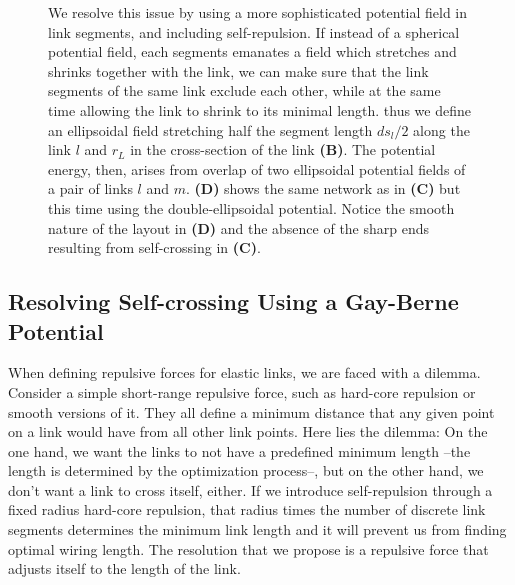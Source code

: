 \documentclass[nofootinbib,preprint,floatfix,titlepage,superscriptaddress]{revtex4} %
\begin{document}
\begin{figure}
{    We resolve this issue by using a more sophisticated potential field in link segments, and including self-repulsion. 
    If instead of a spherical potential field, each segments emanates a field which stretches and shrinks together with the link, we can make sure that the link segments of the same link exclude each other, while at the same time allowing the link to shrink to its minimal length.
    thus we define an ellipsoidal field stretching half the segment length $ds_l/2$ along the link $l$ and $r_L$ in the cross-section of the link {\bf(B)}. 
    The potential energy, then, arises from overlap of two ellipsoidal potential fields of a pair of links $l$ and $m$. {\bf(D)} shows the same network as in {\bf(C)} but this time using the double-ellipsoidal potential. 
    Notice the smooth nature of the layout in {\bf(D)} and the absence of the sharp ends resulting from self-crossing in {\bf(C)}.  
    }
    \label{fig:ell}
\end{figure}

\subsection{Resolving Self-crossing Using a Gay-Berne Potential \label{ap:gay-berne}}
When defining repulsive forces for elastic links, we are faced with a dilemma. 
Consider a simple short-range repulsive force, such as hard-core repulsion or smooth versions of it. 
They all define a minimum distance that any given point on a link would have from all other link points. 
Here lies the dilemma: 
On the one hand, we want the links to not have a predefined minimum length --the length is determined by the optimization process--, but on the other hand, we don't want a link to cross itself, either. 
If we introduce self-repulsion through a fixed radius hard-core repulsion, that radius times the number of discrete link segments determines the minimum link length and it will prevent us from finding optimal wiring length. 
The resolution that we propose is a repulsive force that adjusts itself to the length of the link. 
\end{document}
